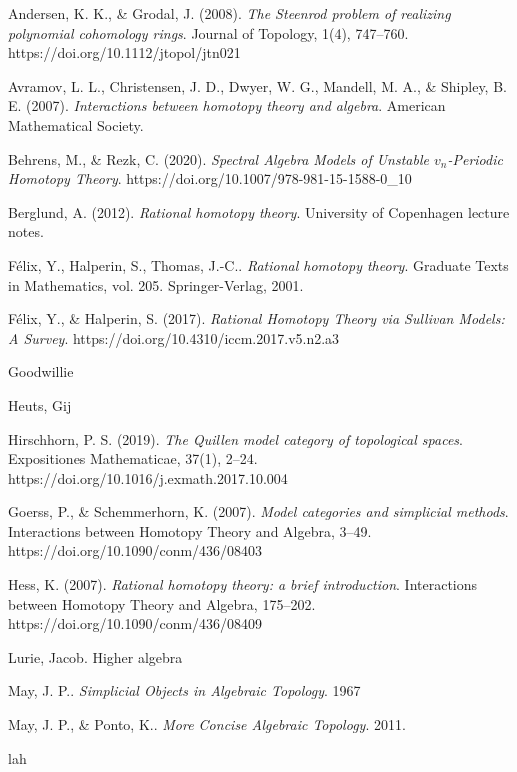 \documentclass[psamsfonts]{amsart}
\theoremstyle{definition}
\theoremstyle{remark}
\numberwithin{equation}{section}
\begin{document}
\newpage
\begin{thebibliography}{2}

Andersen, K. K., \& Grodal, J. (2008). \textit{The Steenrod problem of realizing polynomial cohomology rings}. Journal of Topology, 1(4), 747–760. https://doi.org/10.1112/jtopol/jtn021 

Avramov, L. L., Christensen, J. D., Dwyer, W. G., Mandell, M. A., \& Shipley, B. E. (2007). \textit{Interactions between homotopy theory and algebra}. American Mathematical Society.

Behrens, M., \& Rezk, C. (2020). \textit{Spectral Algebra Models of Unstable $v_n$-Periodic Homotopy Theory}. https://doi.org/10.1007/978-981-15-1588-0\_10 

Berglund, A. (2012). \textit{Rational homotopy theory}. University of Copenhagen lecture notes.

Félix, Y., Halperin, S., Thomas, J.-C.. \textit{Rational homotopy theory}. Graduate Texts in Mathematics, vol. 205. Springer-Verlag, 2001.

Félix, Y., \& Halperin, S. (2017). \textit{Rational Homotopy Theory via Sullivan Models: A Survey}. https://doi.org/10.4310/iccm.2017.v5.n2.a3

 Goodwillie

 Heuts, Gij

Hirschhorn, P. S. (2019). \textit{The Quillen model category of topological spaces}. Expositiones Mathematicae, 37(1), 2–24. https://doi.org/10.1016/j.exmath.2017.10.004 

Goerss, P., \& Schemmerhorn, K. (2007). \textit{Model categories and simplicial methods}. Interactions between Homotopy Theory and Algebra, 3–49. https://doi.org/10.1090/conm/436/08403 

Hess, K. (2007). \textit{Rational homotopy theory: a brief introduction}. Interactions between Homotopy Theory and Algebra, 175–202. https://doi.org/10.1090/conm/436/08409

 Lurie, Jacob. Higher algebra

 May, J. P.. \textit{Simplicial Objects in Algebraic Topology}. 1967

May, J. P., \& Ponto, K.. \textit{More Concise Algebraic Topology}. 2011.

 lah


\end{thebibliography}
\end{document}
